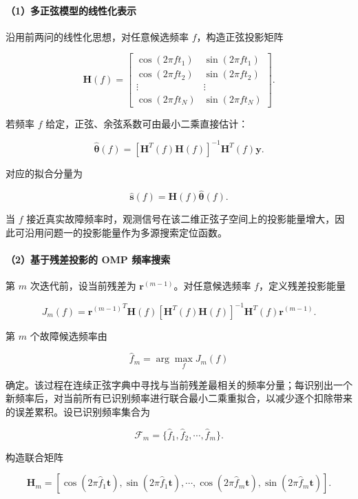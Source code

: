 \documentclass[UTF8,a4paper,12pt]{ctexart}
\numberwithin{figure}{section}
\numberwithin{table}{section}
\begin{document}
\paragraph{（1）多正弦模型的线性化表示}


沿用前两问的线性化思想，对任意候选频率 \(f\)，构造正弦投影矩阵


\[
\mathbf H(f)=
\begin{bmatrix}
\cos(2\pi f t_1)&\sin(2\pi f t_1)\\
\cos(2\pi f t_2)&\sin(2\pi f t_2)\\
\vdots&\vdots\\
\cos(2\pi f t_N)&\sin(2\pi f t_N)
\end{bmatrix}.
\]


若频率 \(f\) 给定，正弦、余弦系数可由最小二乘直接估计：


\[
\hat{\boldsymbol\theta}(f)
=
\left[\mathbf H^T(f)\mathbf H(f)\right]^{-1}
\mathbf H^T(f)\mathbf y.
\]


对应的拟合分量为


\[
\hat{\mathbf s}(f)=\mathbf H(f)\hat{\boldsymbol\theta}(f).
\]


当 \(f\) 接近真实故障频率时，观测信号在该二维正弦子空间上的投影能量增大，因此可沿用问题一的投影能量作为多源搜索定位函数。


\paragraph{（2）基于残差投影的 OMP 频率搜索}


第 \(m\) 次迭代前，设当前残差为 \(\mathbf r^{(m-1)}\)。对任意候选频率 \(f\)，定义残差投影能量


\[
J_m(f)=
{\mathbf r^{(m-1)}}^{T}\mathbf H(f)
\left[\mathbf H^{T}(f)\mathbf H(f)\right]^{-1}
\mathbf H^{T}(f)\mathbf r^{(m-1)}.
\]


第 \(m\) 个故障候选频率由


\[
\hat f_m=\arg\max_f J_m(f)
\]


确定。该过程在连续正弦字典中寻找与当前残差最相关的频率分量；每识别出一个新频率后，对当前所有已识别频率进行联合最小二乘重拟合，以减少逐个扣除带来的误差累积。设已识别频率集合为


\[
\mathcal F_m=\{\hat f_1,\hat f_2,\cdots,\hat f_m\}.
\]


构造联合矩阵


\[
\mathbf H_m=
\left[
\cos(2\pi \hat f_1\mathbf t),\sin(2\pi \hat f_1\mathbf t),
\cdots,
\cos(2\pi \hat f_m\mathbf t),\sin(2\pi \hat f_m\mathbf t)
\right].
\]
\end{document}
